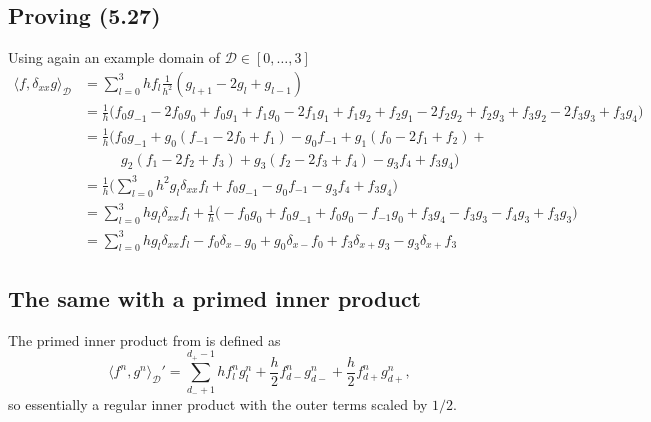 \documentclass[dvipsnames]{article}
\begin{document}
\subsection{Proving (5.27)}
Using again an example domain of $\mathcal{D}\in [0,\hdots,3]$ 
\begin{equation}
    \begin{aligned}
        \langle f,\delta_{xx}g \rangle_\mathcal{D} &= \sum_{l=0}^3 h f_l\frac{1}{h^2}(g_{l+1}-2g_l+g_{l-1})\\
        &= \frac{1}{h}\Big(f_0g_{-1} - 2 f_0g_0 + f_0g_1 + f_1g_0 - 2 f_1g_1 + f_1g_2+ f_2g_{1} - 2 f_2g_2 + f_2g_3 + f_3g_2 - 2f_3g_3 + f_3g_4 \Big)\\
        &=\frac{1}{h}\Big(f_0g_{-1} + g_0(f_{-1}-2f_0+f_1) - g_0f_{-1} + g_1(f_0-2f_1+f_2)+\\
        &\qquad\ \ \;g_2(f_1-2f_2+f_3)+ g_3(f_2-2f_3+f_4) - g_3f_4 + f_3g_4\Big)\\
        &=\frac{1}{h}\Big(\sum_{l=0}^3 h^2 g_l\delta_{xx}f_l + f_0g_{-1}-g_0f_{-1} - g_3f_4 + f_3g_4\Big)\\
        &= \sum_{l=0}^3 h g_l\delta_{xx}f_l + \frac{1}{h}\Big(-f_0g_0+f_0g_{-1}+f_0g_0-f_{-1}g_0+f_3g_4-f_3g_3-f_4g_3+f_3g_3\Big)\\
        &= \sum_{l=0}^3 h g_l\delta_{xx}f_l -f_0\delta_{x-}g_0+g_0\delta_{x-}f_0+f_3\delta_{x+}g_3-g_3\delta_{x+}f_3
    \end{aligned}
\end{equation}
\subsection{The same with a primed inner product}
The primed inner product from \cite{Bilbao2009} is defined as
\begin{equation}
    \langle f^n,g^n \rangle_\mathcal{D}' = \sum_{d_-+1}^{d_+-1}hf_l^ng_l^n+\frac{h}{2}f_{d-}^ng_{d-}^n+\frac{h}{2}f_{d+}^ng_{d+}^n,
\end{equation}
so essentially a regular inner product with the outer terms scaled by $1/2$.
\end{document}
